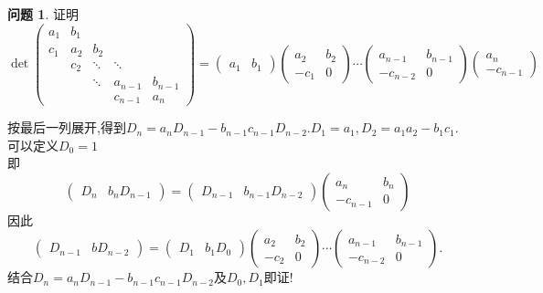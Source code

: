 \documentclass[11pt]{ctexart}
\theoremstyle{definition}
\newtheorem{qqq}{问题}[section]
\numberwithin{equation}{section}
\begin{document}
\[{}\]
\begin{qqq}
    证明
    \begin{equation}
        \det\begin{pmatrix}
            a_1&b_1\\c_1&a_2&b_2\\ &c_2&\ddots&\ddots&\\ &&\ddots&a_{n-1}&b_{n-1}\\&&&c_{n-1}&a_n
        \end{pmatrix}=\begin{pmatrix}
            a_1&b_1
        \end{pmatrix}\begin{pmatrix}
            a_2&b_2\\-c_1&0
        \end{pmatrix}\cdots\begin{pmatrix}
            a_{n-1}&b_{n-1}\\-c_{n-2}&0
        \end{pmatrix}\begin{pmatrix}
            a_n\\-c_{n-1}
        \end{pmatrix}
    \end{equation}
\end{qqq}
\begin{aaa}
    按最后一列展开,得到$D_n=a_nD_{n-1}-b_{n-1}c_{n-1}D_{n-2}$.\quad $D_1=a_1,D_2=a_1a_2-b_1c_1.$\\
    可以定义$D_0=1$\\
    即\[\begin{pmatrix}
        D_n&b_nD_{n-1}
    \end{pmatrix}=
    \begin{pmatrix}
        D_{n-1}&b_{n-1}D_{n-2}
    \end{pmatrix}
    \begin{pmatrix}
        a_n&b_n\\-c_{n-1}&0
    \end{pmatrix}\]
    因此\[\begin{pmatrix}
        D_{n-1}&bD_{n-2}
    \end{pmatrix}=
    \begin{pmatrix}
        D_1&b_1D_0
    \end{pmatrix}\begin{pmatrix}
        a_2&b_2\\-c_2&0
    \end{pmatrix}\cdots\begin{pmatrix}
        a_{n-1}&b_{n-1}\\-c_{n-2}&0
    \end{pmatrix}.\]
    结合$D_n=a_nD_{n-1}-b_{n-1}c_{n-1}D_{n-2}$及$D_0,D_1$即证!
\end{aaa}
\end{document}
